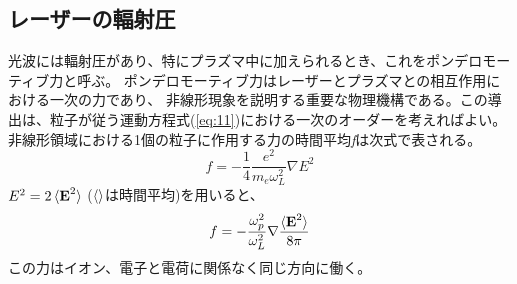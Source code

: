 \documentclass[a4paper,11pt,titlepage]{jsarticle}
\begin{document}
  \subsection{レーザーの輻射圧}
  光波には輻射圧があり、特にプラズマ中に加えられるとき、これをポンデロモーティブ力と呼ぶ。
  ポンデロモーティブ力はレーザーとプラズマとの相互作用における一次の力であり、
  非線形現象を説明する重要な物理機構である。この導出は、粒子が従う運動方程式(\ref{eq:11})における一次のオーダーを考えればよい。
  非線形領域における1個の粒子に作用する力の時間平均\textit{f}は次式で表される。
  \begin{equation}
    \label{eq:22}
    f = - \frac{1}{4} \frac{e^2}{m_e \omega_L^2} \nabla E^2
  \end{equation}
  $E^2 = 2 \braket{ \textbf{E}^2 }$ ($\braket{}$は時間平均)を用いると、
  \begin{equation}
    \label{eq:23}
    f = - \frac{\omega_p^2}{\omega_L^2} \nabla \frac{\braket{\textbf{E}^2}}{8\pi}
  \end{equation}
  この力はイオン、電子と電荷に関係なく同じ方向に働く。
\end{document}
